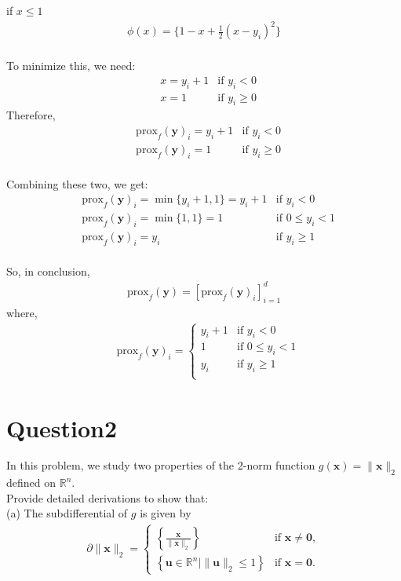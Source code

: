 \documentclass{article}
\newcommand{\R}{\mathbb{R}}
\begin{document}
if \(x \leq 1\)
\begin{align*}
    \phi(x) = \{ 1 - x + \frac{1}{2} (x - y_i)^2 \} \\
\end{align*}

To minimize this, we need:
\begin{align*}
    &x = y_i + 1 &\text{if }y_i < 0 \\
    &x = 1 &\text{if }y_i \geq 0
\end{align*}
Therefore, 
\begin{align*}
    &\text{prox}_f(\bm{y})_i = y_i + 1 &\text{if } y_i < 0 \\
    &\text{prox}_f(\bm{y})_i = 1 &\text{if } y_i \geq 0 \\
\end{align*}

\noindent
Combining these two, we get:
\begin{align*}
    &\text{prox}_f(\bm{y})_i = \min\{y_i + 1, 1\} = y_i + 1 &\text{if } y_i < 0 \\
    &\text{prox}_f(\bm{y})_i = \min\{1, 1\} = 1 &\text{if } 0 \leq y_i < 1 \\ 
    &\text{prox}_f(\bm{y})_i = y_i &\text{if } y_i \geq 1 \\
\end{align*}

\noindent
So, in conclusion, 
\begin{align*}
    \text{prox}_f(\bm{y}) = [\text{prox}_f(\bm{y})_i]_{i=1}^{d}
\end{align*}
where,
\begin{align*}
    &\text{prox}_f(\bm{y})_i = \begin{cases} y_i + 1 &\text{if } y_i < 0 \\
    1 &\text{if } 0 \leq y_i < 1 \\ 
    y_i &\text{if } y_i \geq 1 \\
    \end{cases}
\end{align*}






\section*{Question2}
In this problem, we study two properties of the 2-norm function \(g(\bm{x}) = \|\bm{x}\|_2\) defined on \(\R^n\). \\
Provide detailed derivations to show that: \\
\noindent
(a) The subdifferential of \(g\) is given by
\begin{align*}
    \partial \|\bm{x}\|_2 = \begin{cases}
        \left\{ \frac{\bm{x}}{\|\bm{x}\|_2}\right\} &\text{if } \bm{x} \ne \bm{0}, \\
        \left\{ \bm{u} \in \R^n | \|\bm{u}\|_2 \leq 1\right\} &\text{if } \bm{x} = \bm{0}.
    \end{cases}
\end{align*}
\end{document}
